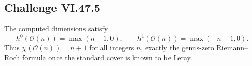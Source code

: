 \subsection*{Challenge VI.47.5}
\begin{solution}
The computed dimensions satisfy
\[
h^0(\mathcal O(n))=\max(n+1,0),\qquad h^1(\mathcal O(n))=\max(-n-1,0).
\]
Thus \(\chi(\mathcal O(n))=n+1\) for all integers \(n\), exactly the genus-zero Riemann--Roch formula once the standard cover is known to be Leray.
\end{solution}

